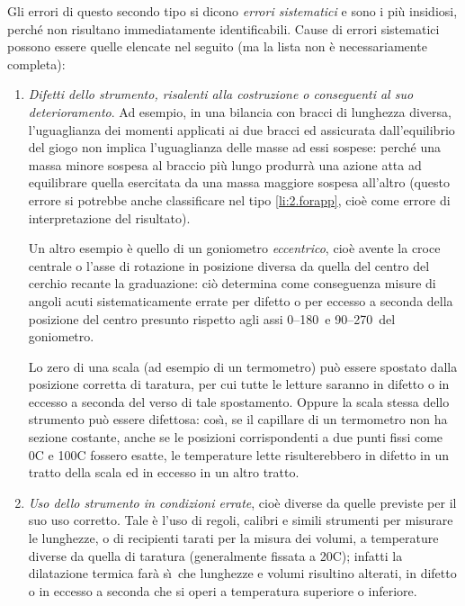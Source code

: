 Gli errori di questo secondo tipo si dicono
\emph{errori sistematici}%
e sono i pi\`u insidiosi, perch\'e non risultano
immediatamente identificabili.  Cause di errori sistematici
possono essere quelle elencate nel seguito (ma la lista non
\`e necessariamente completa):
\begin{enumerate}
\item \emph{Difetti dello strumento, risalenti alla
    costruzione o conseguenti al suo deterioramento}.  Ad
  esempio, in una bilancia con bracci di lunghezza diversa,
  l'uguaglianza dei momenti applicati ai due bracci ed
  assicurata dall'equilibrio del giogo non implica
  l'uguaglianza delle masse ad essi sospese: perch\'e una
  massa minore sospesa al braccio pi\`u lungo produrr\`a una
  azione atta ad equilibrare quella esercitata da una massa
  maggiore sospesa all'altro (questo errore si potrebbe
  anche classificare nel tipo \ref{li:2.forapp}, cio\`e come
  errore di interpretazione del risultato).

  Un altro esempio \`e quello di un goniometro
  \emph{eccentrico}, cio\`e avente la croce centrale o
  l'asse di rotazione in posizione diversa da quella del
  centro del cerchio recante la graduazione: ci\`o determina
  come conseguenza misure di angoli acuti sistematicamente
  errate per difetto o per eccesso a seconda della posizione
  del centro presunto rispetto agli assi 0\gra--180\gra\ e
  90\gra--270\gra\ del goniometro.

  Lo zero di una scala (ad esempio di un termometro) pu\`o
  essere spostato dalla posizione corretta di taratura, per
  cui tutte le letture saranno in difetto o in eccesso a
  seconda del verso di tale spostamento.  Oppure la scala
  stessa dello strumento pu\`o essere difettosa: cos\`\i, se
  il capillare di un termometro non ha sezione costante,
  anche se le posizioni corrispondenti a due punti fissi
  come 0\gra{}C e 100\gra{}C fossero esatte, le temperature
  lette risulterebbero in difetto in un tratto della scala
  ed in eccesso in un altro tratto.
\item \emph{Uso dello strumento in condizioni errate},
  cio\`e diverse da quelle previste per il suo uso corretto.
  Tale \`e l'uso di regoli, calibri e simili strumenti per
  misurare le lunghezze, o di recipienti tarati per la
  misura dei volumi, a temperature diverse da quella di
  taratura (generalmente fissata a 20\gra{}C); infatti la
  dilatazione termica far\`a s\`\i\ che lunghezze e volumi
  risultino alterati, in difetto o in eccesso a seconda che
  si operi a temperatura superiore o inferiore.


\end{enumerate}
